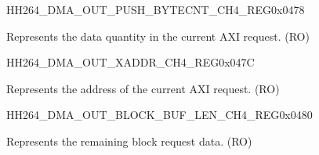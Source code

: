     
    \begin{register}{H}{H264\_DMA\_OUT\_PUSH\_BYTECNT\_CH4\_REG}{0x0478}\label{regdesc:H264DMAOUTPUSHBYTECNTCH4REG}
    \regnewline%
    \begin{regdesc}\begin{reglist}
    \label{fielddesc:H264DMAOUTCMDFIFOPUSHBYTECNTCH4}\item [H264\_DMA\_OUT\_CMDFIFO\_PUSH\_BYTECNT\_CH4] Represents the data quantity in the current AXI request. (RO)
    \end{reglist}\end{regdesc}
    \end{register}
    
    
    \begin{register}{H}{H264\_DMA\_OUT\_XADDR\_CH4\_REG}{0x047C}\label{regdesc:H264DMAOUTXADDRCH4REG}
    \regnewline%
    \begin{regdesc}\begin{reglist}
    \label{fielddesc:H264DMAOUTCMDFIFOXADDRCH4}\item [H264\_DMA\_OUT\_CMDFIFO\_XADDR\_CH4] Represents the address of the current AXI request. (RO)
    \end{reglist}\end{regdesc}
    \end{register}
    
    
    \begin{register}{H}{H264\_DMA\_OUT\_BLOCK\_BUF\_LEN\_CH4\_REG}{0x0480}\label{regdesc:H264DMAOUTBLOCKBUFLENCH4REG}
    \regnewline%
    \begin{regdesc}\begin{reglist}
    \label{fielddesc:H264DMAOUTBLOCKBUFLENCH4}\item [H264\_DMA\_OUT\_BLOCK\_BUF\_LEN\_CH4] Represents the remaining block request data. (RO)
    \end{reglist}\end{regdesc}
    \end{register}
    
